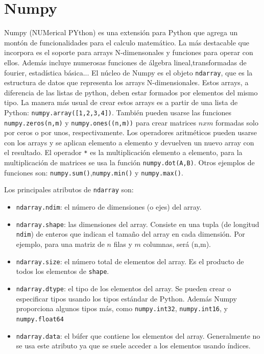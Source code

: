 \documentclass[a4paper,openright, 12pt]{book}
\begin{document}
\section{Numpy}
Numpy (NUMerical PYthon) es una extensión para Python que agrega un montón de funcionalidades para el calculo matemático. La más destacable que incorpora es el soporte para arrays N-dimensonales y funciones para operar con ellos. Además incluye numerosas funciones de álgebra lineal,transformadas de fourier, estadística básica...
\newline
El núcleo de Numpy es el objeto \lstinline|ndarray|, que es la estructura de datos que representa los arrays N-dimensionales. Estos arrays, a diferencia de las listas de python, deben estar formados por elementos del mismo tipo.
La manera más usual de crear estos arrays es a partir de una lista de Python: \lstinline|numpy.array([1,2,3,4])|. También pueden usarse las funciones \lstinline|numpy.zeros(n,m)| y \lstinline|numpy.ones((n,m))| para crear matrices $nxm$ formadas solo por ceros o por unos, respectivamente.
\newline
Los operadores aritméticos pueden usarse con los arrays y se aplican elemento a elemento y devuelven un nuevo array con el resultado.
El operador \lstinline|*| es la multiplicación elemento a elemento, para la multiplicación de matrices se usa la función \lstinline|numpy.dot(A,B)|.
Otros ejemplos de funciones son: \lstinline|numpy.sum()|,\lstinline|numpy.min()| y \lstinline|numpy.max()|.

Los principales atributos de \lstinline|ndarray| son:
 \begin{itemize}
\item \lstinline|ndarray.ndim|: el número de dimensiones (o ejes) del array.
 
\item \lstinline|ndarray.shape|: las dimensiones del array. Consiste en una tupla (de longitud \lstinline|ndim|) de enteros que indican el tamaño del array en cada dimensión. Por ejemplo, para una matriz de $n$ filas y $m$ columnas, será (n,m).

\item  \lstinline|ndarray.size|: el número total de elementos del array. Es el producto de todos los elementos de \lstinline|shape|. 

\item\lstinline|ndarray.dtype|: el tipo de los elementos del array. Se pueden crear o especificar tipos usando los tipos estándar de Python. Además Numpy proporciona algunos tipos más, como \lstinline|numpy.int32|, \lstinline|numpy.int16|, y \lstinline|numpy.float64|

\item \lstinline|ndarray.data|: el búfer que contiene los elementos del array. Generalmente no se usa este atributo ya que se suele acceder a los elementos usando índices.
 \end{itemize}
\end{document}
